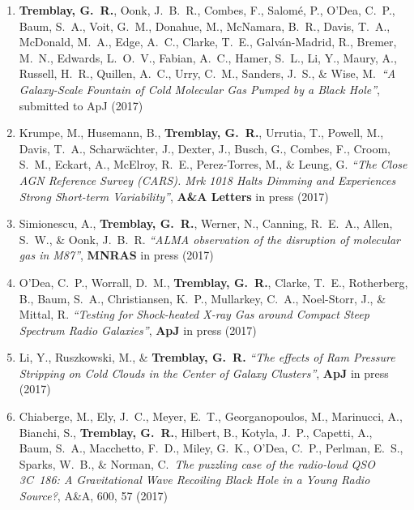 \documentclass[11pt]{article}
\begin{document}
\begin{enumerate}%


\item {\bf Tremblay, G.~R.}, Oonk, J.~B.~R., Combes, F., Salom\'{e}, P., O'Dea, C.~P., Baum, S.~A., Voit, G.~M., Donahue, M., McNamara, B.~R., Davis, T.~A., McDonald, M.~A., Edge, A.~C., Clarke, T.~E., Galv\'{a}n-Madrid, R., Bremer, M.~N., Edwards, L.~O.~V., Fabian, A.~C.,  Hamer, S.~L., Li, Y., Maury, A., Russell, H.~R., Quillen, A.~C., Urry, C.~M., Sanders, J.~S., \& Wise, M.\ {\it ``A Galaxy-Scale Fountain of Cold Molecular Gas Pumped by a Black Hole''}, submitted to ApJ (2017)


\item Krumpe, M., Husemann, B., \textbf{Tremblay, G.~R.}, Urrutia, T., Powell, M., Davis, T.~A., Scharw\"{a}chter, J., Dexter, J., Busch, G., Combes, F., Croom, S.~M., 
Eckart, A., McElroy, R.~E., Perez-Torres, M., \& Leung, G. \textit{``The Close AGN Reference Survey (CARS). Mrk 1018 Halts Dimming and Experiences Strong Short-term Variability''}, \textbf{A\&A Letters} in press (2017)

\item Simionescu, A., \textbf{Tremblay, G.~R.}, Werner, N., Canning, R.~E.~A., Allen, S.~W., \& Oonk, J.~B.~R.
\textit{``ALMA observation of the disruption of 
molecular gas in M87''}, \textbf{MNRAS} in press (2017)

\item O'Dea, C.~P., Worrall, D.~M., \textbf{Tremblay, G.~R.}, Clarke, T.~E., Rotherberg, B., Baum, S.~A., 
Christiansen, K.~P., Mullarkey, C.~A., Noel-Storr, 
J., \& Mittal, R. \textit{``Testing for Shock-heated X-ray Gas around Compact Steep Spectrum Radio Galaxies''}, \textbf{ApJ} in press (2017)


\item Li, Y., Ruszkowski, M., \& {\bf Tremblay, G.~R.} {\it ``The effects of Ram Pressure Stripping on Cold Clouds in the Center of Galaxy Clusters''}, \textbf{ApJ} in press (2017)


\item Chiaberge, M., Ely, J.~C., Meyer, E.~T., Georganopoulos, M., Marinucci, A., Bianchi, S.,  {\bf Tremblay, G.~R.}, Hilbert, B., 
Kotyla, J.~P., Capetti, A., Baum, S.~A.,  Macchetto, F.~D., Miley, G.~K., 
O'Dea, C.~P., Perlman, E.~S., Sparks, W.~B., \& Norman, C.\ {\it The puzzling case of the radio-loud QSO 3C~186: A Gravitational Wave Recoiling Black Hole in a Young Radio Source?}, A\&A, 600, 57 (2017)



\end{enumerate}
\end{document}

